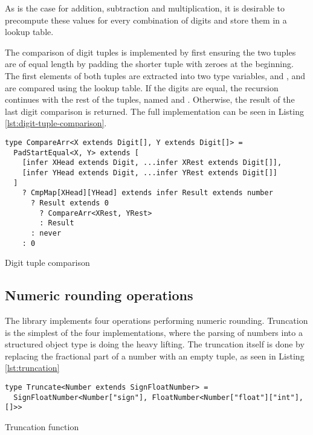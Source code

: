 As is the case for addition, subtraction and multiplication, it is desirable to precompute these values for every combination of digits and store them in a lookup table.

The comparison of digit tuples is implemented by first ensuring the two tuples are of equal length by padding the shorter tuple with zeroes at the beginning. The first elements of both tuples are extracted into two type variables,  and , and are compared using the lookup table. If the digits are equal, the recursion continues with the rest of the tuples, named  and . Otherwise, the result of the last digit comparison is returned. The full implementation can be seen in Listing \ref{lst:digit-tuple-comparison}.

\begin{listing}[ht]
  \begin{verbatim}
type CompareArr<X extends Digit[], Y extends Digit[]> = 
  PadStartEqual<X, Y> extends [
    [infer XHead extends Digit, ...infer XRest extends Digit[]],
    [infer YHead extends Digit, ...infer YRest extends Digit[]]
  ]
    ? CmpMap[XHead][YHead] extends infer Result extends number
      ? Result extends 0
        ? CompareArr<XRest, YRest>
        : Result
      : never
    : 0
\end{verbatim}
  \caption{Digit tuple comparison}\label{lst:digit-tuple-comparison}
\end{listing}

\subsection{Numeric rounding operations}

The library implements four operations performing numeric rounding. Truncation is the simplest of the four implementations, where the parsing of numbers into a structured object type is doing the heavy lifting. The truncation itself is done by replacing the fractional part of a number with an empty tuple, as seen in Listing \ref{lst:truncation}

\begin{listing}[ht]
  \begin{verbatim}
type Truncate<Number extends SignFloatNumber> =
  SignFloatNumber<Number["sign"], FloatNumber<Number["float"]["int"], []>>
\end{verbatim}
  \caption{Truncation function}\label{lst:truncation}
\end{listing}

